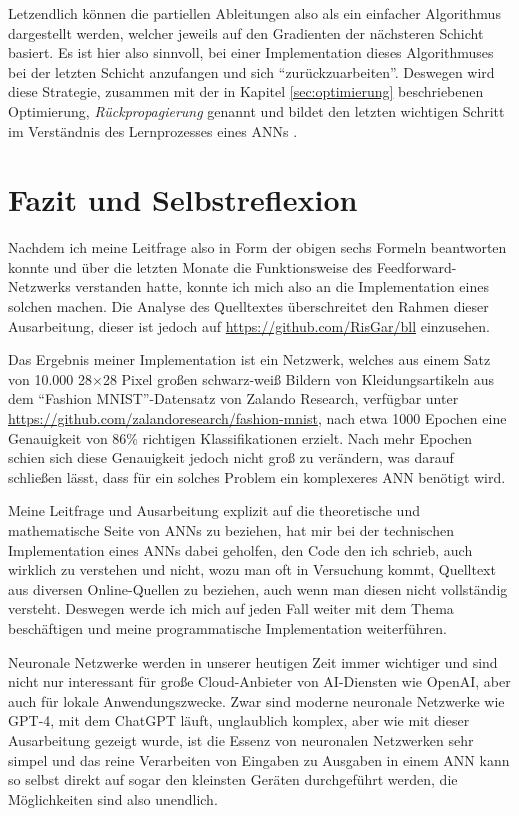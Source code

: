 \documentclass[12pt,titlepage]{article}
\begin{document}
Letzendlich können die partiellen Ableitungen also als ein einfacher Algorithmus dargestellt werden, welcher jeweils auf den Gradienten der nächsteren Schicht basiert. Es ist hier also sinnvoll, bei einer Implementation dieses Algorithmuses bei der letzten Schicht anzufangen und sich \enquote{zurückzuarbeiten}. Deswegen wird diese Strategie, zusammen mit der in Kapitel \ref{sec:optimierung} beschriebenen Optimierung, \textit{Rückpropagierung} genannt und bildet den letzten wichtigen Schritt im Verständnis des Lernprozesses eines ANNs \autocite[Kapitel 2]{nielsenNeuralNetworksDeep2015}.

\section{Fazit und Selbstreflexion}

Nachdem ich meine Leitfrage also in Form der obigen sechs Formeln beantworten konnte und über die letzten Monate die Funktionsweise des Feedforward-Netzwerks verstanden hatte, konnte ich mich also an die Implementation eines solchen machen. Die Analyse des Quelltextes überschreitet den Rahmen dieser Ausarbeitung, dieser ist jedoch auf \url{https://github.com/RisGar/bll} einzusehen.

Das Ergebnis meiner Implementation ist ein Netzwerk, welches aus einem Satz von 10.000 28$\times$28 Pixel großen schwarz-weiß Bildern von Kleidungsartikeln aus dem \enquote{Fashion MNIST}-Datensatz von Zalando Research, verfügbar unter \url{https://github.com/zalandoresearch/fashion-mnist}, nach etwa 1000 Epochen eine Genauigkeit von 86\% richtigen Klassifikationen erzielt. Nach mehr Epochen schien sich diese Genauigkeit jedoch nicht groß zu verändern, was darauf schließen lässt, dass für ein solches Problem ein komplexeres ANN benötigt wird.

Meine Leitfrage und Ausarbeitung explizit auf die theoretische und mathematische Seite von ANNs zu beziehen, hat mir bei der technischen Implementation eines ANNs dabei geholfen, den Code den ich schrieb, auch wirklich zu verstehen und nicht, wozu man oft in Versuchung kommt, Quelltext aus diversen Online-Quellen zu beziehen, auch wenn man diesen nicht vollständig versteht. Deswegen werde ich mich auf jeden Fall weiter mit dem Thema beschäftigen und meine programmatische Implementation weiterführen.

Neuronale Netzwerke werden in unserer heutigen Zeit immer wichtiger und sind nicht nur interessant für große Cloud-Anbieter von AI-Diensten wie OpenAI, aber auch für lokale Anwendungszwecke. Zwar sind moderne neuronale Netzwerke wie GPT-4, mit dem ChatGPT läuft, unglaublich komplex, aber wie mit dieser Ausarbeitung gezeigt wurde, ist die Essenz von neuronalen Netzwerken sehr simpel und das reine Verarbeiten von Eingaben zu Ausgaben in einem ANN kann so selbst direkt auf sogar den kleinsten Geräten durchgeführt werden, die Möglichkeiten sind also unendlich.

\newpage
\printbibliography[heading=bibintoc, title={Literaturverweise}]
\end{document}

